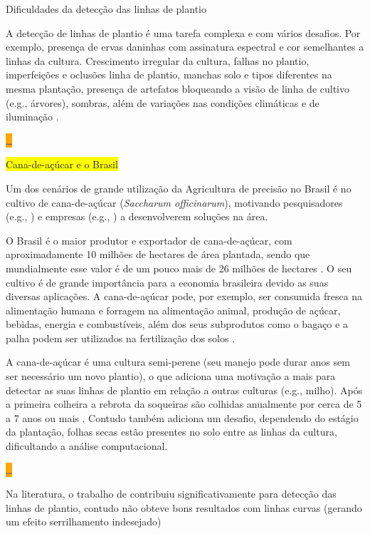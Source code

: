 \documentclass[12pt, a4paper, english, brazil]{article}
\newcommand{\textRed}[1]{{{\color{red} #1}}}
\newcommand{\dotsBlue}{\colorbox{orange}{\textcolor{blue}{\dots}}}
\newcommand{\boxYellow}[1]{\colorbox{yellow}{#1}}
\begin{document}
\textRed{Dificuldades da detecção das linhas de plantio}

A detecção de linhas de plantio é uma tarefa complexa e com vários desafios. Por exemplo, presença de ervas daninhas com assinatura espectral e cor semelhantes a linhas da cultura. Crescimento irregular da cultura, falhas no plantio, imperfeições e oclusões linha de plantio, manchas solo e tipos diferentes na mesma plantação, presença de artefatos bloqueando a visão de linha de cultivo (e.g., árvores), sombras, além de variações nas condições climáticas e de iluminação \cite{Rabab_2021, Doha_2021}.

\dotsBlue

\boxYellow{Cana-de-açúcar e o Brasil}

Um dos cenários de grande utilização da Agricultura de precisão no Brasil é no cultivo de cana-de-açúcar (\textit{Saccharum officinarum}), motivando pesquisadores (e.g., ) e empresas (e.g., ) a desenvolverem soluções na área.

O Brasil é o maior produtor e exportador de cana-de-açúcar, com aproximadamente 10 milhões de hectares de área plantada, sendo que mundialmente esse valor é de um pouco mais de 26 milhões de hectares \cite{Ritchie_2020, IBGE_2021, FAOSTAT_2021}. O seu cultivo é de grande importância para a economia brasileira devido as suas diversas aplicações. A cana-de-açúcar pode, por exemplo, ser consumida fresca na alimentação humana e forragem na alimentação animal, produção de açúcar, bebidas, energia e combustíveis, além dos seus subprodutos como o bagaço e a palha podem ser utilizados na fertilização dos solos \cite{Oliveira_2018}.

A cana-de-açúcar é uma cultura semi-perene (seu manejo pode durar anos sem ser necessário um novo plantio), o que adiciona uma motivação a mais para detectar as suas linhas de plantio em relação a outras culturas (e.g., milho). Após a primeira colheira a rebrota da soqueiras são colhidas anualmente por cerca de 5 a 7 anos ou mais \cite{Rudorff_2010}. Contudo também adiciona um desafio, dependendo do estágio da plantação, folhas secas estão presentes no solo entre as linhas da cultura, dificultando a análise computacional.

\dotsBlue

Na literatura, o trabalho de  contribuiu significativamente para detecção das linhas de plantio, contudo não obteve bons resultados com linhas curvas (gerando um efeito serrilhamento indesejado) 
\end{document}
